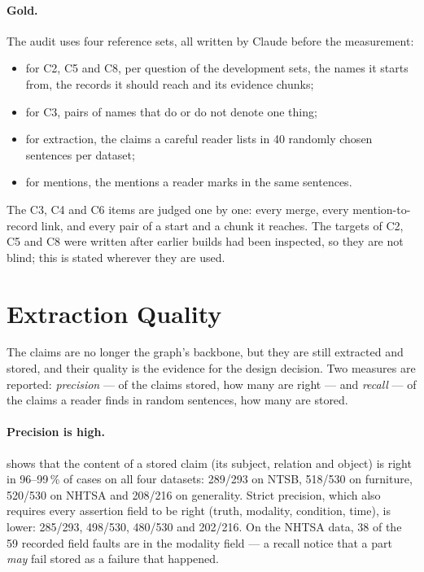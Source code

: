 \paragraph{Gold.} The audit uses four reference sets, all written by Claude before the measurement:
\begin{itemize}[nosep]
\item for C2, C5 and C8, per question of the development sets, the names it starts from, the records it should reach
and its evidence chunks;
\item for C3, pairs of names that do or do not denote one thing;
\item for extraction, the claims a careful reader lists in 40 randomly chosen sentences per dataset;
\item for mentions, the mentions a reader marks in the same sentences.
\end{itemize}
The C3, C4 and C6 items are judged one by one: every merge, every mention-to-record link, and every pair of a start
and a chunk it reaches. The targets of C2, C5 and C8 were written after earlier builds had been inspected, so they
are not blind; this is stated wherever they are used.

\section{Extraction Quality}\label{sec:ch05-extraction}

The claims are no longer the graph's backbone, but they are still extracted and stored, and their quality is the
evidence for the design decision. Two measures are reported: \emph{precision} --- of the claims stored, how many
are right --- and \emph{recall} --- of the claims a reader finds in random sentences, how many are stored.

\paragraph{Precision is high.}  shows that the content of a stored claim (its subject,
relation and object) is right in 96--99\,\% of cases on all four datasets: 289/293 on NTSB, 518/530 on furniture,
520/530 on NHTSA and 208/216 on generality. Strict precision, which also requires every assertion field to be
right (truth, modality, condition, time), is lower: 285/293, 498/530, 480/530 and 202/216. On the NHTSA data, 38
of the 59 recorded field faults are in the modality field --- a recall notice that a part \emph{may} fail stored as
a failure that happened.


